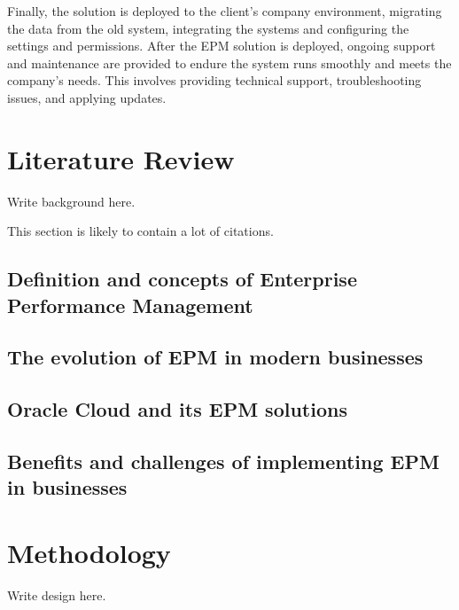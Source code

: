 \documentclass[12pt,a4paper,openright,twoside]{book}
\begin{document}
Finally, the solution is deployed to the client's company environment, migrating the data from the old system, integrating the systems and configuring the settings and permissions.
%
After the EPM solution is deployed, ongoing support and maintenance are provided to endure the system runs smoothly and meets the company's needs.
%
This involves providing technical support, troubleshooting issues, and applying updates.

\chapter{Literature Review}
\label{chap:background}

Write background here.

This section is likely to contain a lot of citations.

\section{Definition and concepts of Enterprise Performance Management}

\section{The evolution of EPM in modern businesses}

\section{Oracle Cloud and its EPM solutions}

\section{Benefits and challenges of implementing EPM in businesses}

\chapter{Methodology}
\label{chap:design}

Write design here.

\end{document}

